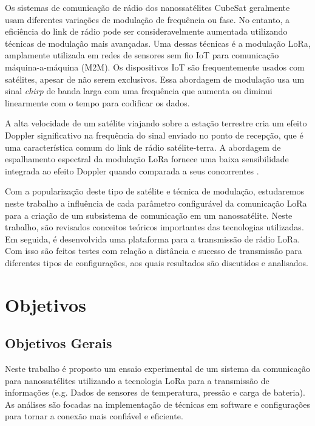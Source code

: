 \documentclass[
	12pt,				%
	openright,			%
	twoside,			%
	a4paper,			%
	english,			%
	french,				%
	spanish,			%
	brazil				%
	]{abntex2}
\begin{document}
Os sistemas de comunicação de rádio dos nanossatélites CubeSat geralmente usam diferentes variações de modulação de frequência ou fase.
No entanto, a eficiência do link de rádio pode ser consideravelmente aumentada utilizando técnicas de modulação mais avançadas.
Uma dessas técnicas é a modulação LoRa, amplamente utilizada em redes de sensores sem fio IoT para comunicação máquina-a-máquina (M2M). Os dispositivos IoT são frequentemente usados com satélites, apesar de não serem exclusivos. 
Essa abordagem de modulação usa um sinal \emph{chirp} de banda larga com uma frequência que aumenta ou diminui linearmente com o tempo para codificar os dados.

A alta velocidade de um satélite viajando sobre a estação terrestre cria um efeito Doppler significativo na frequência do sinal enviado no ponto de recepção, que é uma característica comum do link de rádio satélite-terra.
A abordagem de espalhamento espectral da modulação LoRa fornece uma baixa sensibilidade integrada ao efeito Doppler quando comparada a seus concorrentes \cite{doroshkin_2018}.

Com a popularização deste tipo de satélite e técnica de modulação, estudaremos neste trabalho a influência de cada parâmetro configurável da comunicação LoRa para a criação de um subsistema de comunicação em um nanossatélite. Neste trabalho, são revisados conceitos teóricos importantes das tecnologias utilizadas. Em seguida, é desenvolvida uma plataforma para a transmissão de rádio LoRa. Com isso são feitos testes com relação a distância e sucesso de transmissão para diferentes tipos de configurações, aos quais resultados são discutidos e analisados.


\chapter{Objetivos}

\section{Objetivos Gerais}

Neste trabalho é proposto um ensaio experimental de um sistema da comunicação para nanossatélites utilizando a tecnologia LoRa para a transmissão de informações (e.g. Dados de sensores de temperatura, pressão e carga de bateria). As análises são focadas na implementação de técnicas em software e configurações para tornar a conexão mais confiável e eficiente.
\end{document}
